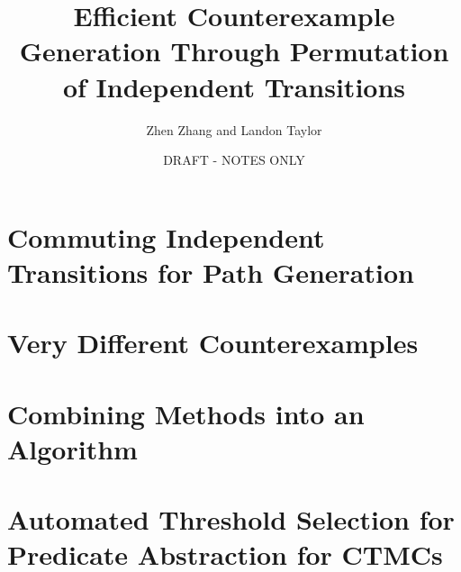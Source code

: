 \documentclass[11pt]{article}
\title{Efficient Counterexample Generation Through Permutation of Independent Transitions}
\author{Zhen Zhang and Landon Taylor}
\date{DRAFT - NOTES ONLY}
\begin{document}
	
	\maketitle
	\tableofcontents
	
	\newpage
	
	
	
	\section{Commuting Independent Transitions for Path Generation}
	
	\newpage
	
	\section{Very Different Counterexamples}
	
	\newpage
	
	\section{Combining Methods into an Algorithm}
	
	\newpage
	
	\section{Automated Threshold Selection for Predicate Abstraction for CTMCs}
	
	
\end{document}
